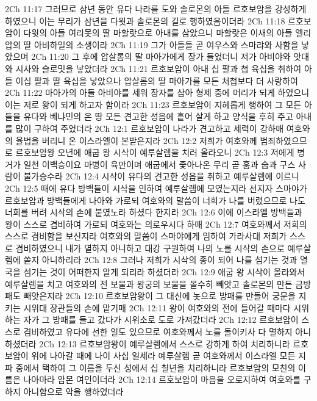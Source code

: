 2Ch 11:17  그러므로 삼년 동안 유다 나라를 도와 솔로몬의 아들 르호보암을 강성하게 하였으니 이는 무리가 삼년을 다윗과 솔로몬의 길로 행하였음이더라
2Ch 11:18  르호보암이 다윗의 아들 여리못의 딸 마할랏으로 아내를 삼았으니 마할랏은 이새의 아들 엘리압의 딸 아비하일의 소생이라
2Ch 11:19  그가 아들들 곧 여우스와 스마랴와 사함을 낳았으며
2Ch 11:20  그 후에 압살롬의 딸 마아가에게 장가 들었더니 저가 아비야와 앗대와 시사와 슬로밋을 낳았더라
2Ch 11:21  르호보암이 아내 십 팔과 첩 육십을 취하여 아들 이십 팔과 딸 육십을 낳았으나 압살롬의 딸 마아가를 모든 처첩보다 더 사랑하여
2Ch 11:22  마아가의 아들 아비야를 세워 장자를 삼아 형제 중에 머리가 되게 하였으니 이는 저로 왕이 되게 하고자 함이라
2Ch 11:23  르호보암이 지혜롭게 행하여 그 모든 아들을 유다와 베냐민의 온 땅 모든 견고한 성읍에 흩어 살게 하고 양식을 후히 주고 아내를 많이 구하여 주었더라
2Ch 12:1  르호보암이 나라가 견고하고 세력이 강하매 여호와의 율법을 버리니 온 이스라엘이 본받은지라
2Ch 12:2  저희가 여호와께 범죄하였으므로 르호보암왕 오년에 애굽 왕 시삭이 예루살렘을 치러 올라오니
2Ch 12:3  저에게 병거가 일천 이백승이요 마병이 육만이며 애굽에서 좇아나온 무리 곧 훔과 숩과 구스 사람이 불가승수라
2Ch 12:4  시삭이 유다의 견고한 성읍을 취하고 예루살렘에 이르니
2Ch 12:5  때에 유다 방백들이 시삭을 인하여 예루살렘에 모였는지라 선지자 스마야가 르호보암과 방백들에게 나아와 가로되 여호와의 말씀이 너희가 나를 버렸으므로 나도 너희를 버려 시삭의 손에 붙였노라 하셨다 한지라
2Ch 12:6  이에 이스라엘 방백들과 왕이 스스로 겸비하여 가로되 여호와는 의로우시다 하매
2Ch 12:7  여호와께서 저희의 스스로 겸비함을 보신지라 여호와의 말씀이 스마야에게 임하여 가라사대 저희가 스스로 겸비하였으니 내가 멸하지 아니하고 대강 구원하여 나의 노를 시삭의 손으로 예루살렘에 쏟지 아니하리라
2Ch 12:8  그러나 저희가 시삭의 종이 되어 나를 섬기는 것과 열국을 섬기는 것이 어떠한지 알게 되리라 하셨더라
2Ch 12:9  애굽 왕 시삭이 올라와서 예루살렘을 치고 여호와의 전 보물과 왕궁의 보물을 몰수히 빼앗고 솔로몬의 만든 금방패도 빼앗은지라
2Ch 12:10  르호보암왕이 그 대신에 놋으로 방패를 만들어 궁문을 지키는 시위대 장관들의 손에 맡기매
2Ch 12:11  왕이 여호와의 전에 들어갈 때마다 시위하는 자가 그 방패를 들고 갔다가 시위소로 도로 가져갔더라
2Ch 12:12  르호보암이 스스로 겸비하였고 유다에 선한 일도 있으므로 여호와께서 노를 돌이키사 다 멸하지 아니하셨더라
2Ch 12:13  르호보암왕이 예루살렘에서 스스로 강하게 하여 치리하니라 르호보암이 위에 나아갈 때에 나이 사십 일세라 예루살렘 곧 여호와께서 이스라엘 모든 지파 중에서 택하여 그 이름을 두신 성에서 십 칠년을 치리하니라 르호보암의 모친의 이름은 나아마라 암몬 여인이더라
2Ch 12:14  르호보암이 마음을 오로지하여 여호와를 구하지 아니함으로 악을 행하였더라
